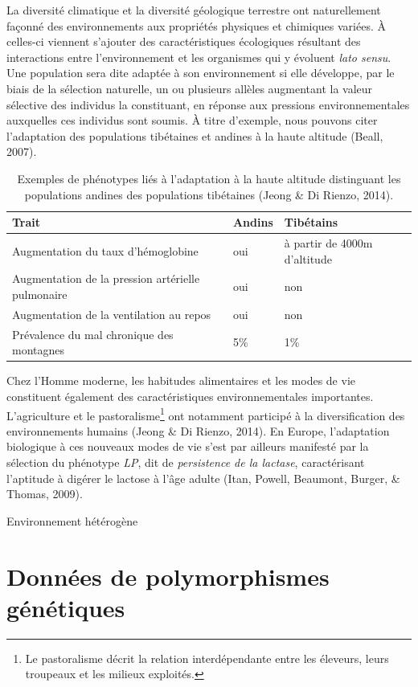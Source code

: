 \documentclass[12pt,a4paper,twoside]{ugathesis}
\theoremstyle{definition}
\theoremstyle{definition}
\theoremstyle{remark}
\begin{document}
La diversité climatique et la diversité géologique terrestre ont
naturellement façonné des environnements aux propriétés physiques et
chimiques variées. À celles-ci viennent s'ajouter des caractéristiques
écologiques résultant des interactions entre l'environnement et les
organismes qui y évoluent \emph{lato sensu}. Une population sera dite
adaptée à son environnement si elle développe, par le biais de la
sélection naturelle, un ou plusieurs allèles augmentant la valeur
sélective des individus la constituant, en réponse aux pressions
environnementales auxquelles ces individus sont soumis. À titre
d'exemple, nous pouvons citer l'adaptation des populations tibétaines et
andines à la haute altitude (Beall, 2007).




\begin{longtable}[t]{p{}p{}p{}}
\caption{\label{tab:andeanvstibetan}Exemples de phénotypes liés à l'adaptation à
la haute altitude distinguant les populations andines des populations
tibétaines (Jeong \& Di Rienzo, 2014).}\\
\toprule
Trait & Andins & Tibétains\\
\midrule
Augmentation du taux d'hémoglobine & oui & à partir de 4000m d'altitude\\
Augmentation de la pression artérielle pulmonaire & oui & non\\
Augmentation de la ventilation au repos & oui & non\\
Prévalence du mal chronique des montagnes & 5\% & 1\%\\
\bottomrule
\end{longtable}
Chez l'Homme moderne, les habitudes alimentaires et les modes de vie
constituent également des caractéristiques environnementales
importantes. L'agriculture et le pastoralisme\footnote{Le pastoralisme
  décrit la relation interdépendante entre les éleveurs, leurs troupeaux
  et les milieux exploités.} ont notamment participé à la
diversification des environnements humains (Jeong \& Di Rienzo, 2014).
En Europe, l'adaptation biologique à ces nouveaux modes de vie s'est par
ailleurs manifesté par la sélection du phénotype \emph{LP}, dit de
\emph{persistence de la lactase}, caractérisant l'aptitude à digérer le
lactose à l'âge adulte (Itan, Powell, Beaumont, Burger, \& Thomas,
2009).

Environnement hétérogène

\section{Données de polymorphismes
génétiques}\label{donnees-de-polymorphismes-genetiques}
\end{document}

